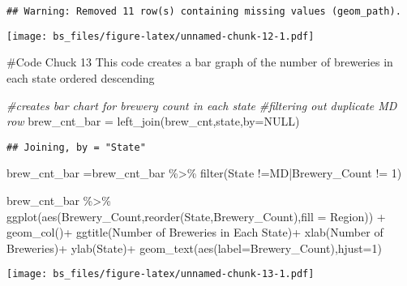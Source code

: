 \documentclass[
]{article}
\newenvironment{Shaded}{\begin{snugshade}}{\end{snugshade}}
\newcommand{\AttributeTok}[1]{\textcolor[rgb]{0.77,0.63,0.00}{#1}}
\newcommand{\CommentTok}[1]{\textcolor[rgb]{0.56,0.35,0.01}{\textit{#1}}}
\newcommand{\ConstantTok}[1]{\textcolor[rgb]{0.00,0.00,0.00}{#1}}
\newcommand{\DecValTok}[1]{\textcolor[rgb]{0.00,0.00,0.81}{#1}}
\newcommand{\FunctionTok}[1]{\textcolor[rgb]{0.00,0.00,0.00}{#1}}
\newcommand{\NormalTok}[1]{#1}
\newcommand{\OtherTok}[1]{\textcolor[rgb]{0.56,0.35,0.01}{#1}}
\newcommand{\SpecialCharTok}[1]{\textcolor[rgb]{0.00,0.00,0.00}{#1}}
\newcommand{\StringTok}[1]{\textcolor[rgb]{0.31,0.60,0.02}{#1}}
\begin{document}
\begin{verbatim}
## Warning: Removed 11 row(s) containing missing values (geom_path).
\end{verbatim}

\texttt{[image: bs\_files/figure-latex/unnamed-chunk-12-1.pdf]}

\#Code Chuck 13 This code creates a bar graph of the number of breweries
in each state ordered descending

\begin{Shaded}
\begin{Highlighting}[]
\CommentTok{\#creates bar chart for brewery count in each state}
\CommentTok{\#filtering out duplicate MD row}
\NormalTok{brew\_cnt\_bar }\OtherTok{=} \FunctionTok{left\_join}\NormalTok{(brew\_cnt,state,}\AttributeTok{by=}\ConstantTok{NULL}\NormalTok{)}
\end{Highlighting}
\end{Shaded}

\begin{verbatim}
## Joining, by = "State"
\end{verbatim}

\begin{Shaded}
\begin{Highlighting}[]
\NormalTok{brew\_cnt\_bar }\OtherTok{=}\NormalTok{brew\_cnt\_bar }\SpecialCharTok{\%\textgreater{}\%} \FunctionTok{filter}\NormalTok{(State }\SpecialCharTok{!=}\StringTok{\textquotesingle{}MD\textquotesingle{}}\SpecialCharTok{|}\NormalTok{Brewery\_Count }\SpecialCharTok{!=} \DecValTok{1}\NormalTok{)}


\NormalTok{brew\_cnt\_bar }\SpecialCharTok{\%\textgreater{}\%}
   \FunctionTok{ggplot}\NormalTok{(}\FunctionTok{aes}\NormalTok{(Brewery\_Count,}\FunctionTok{reorder}\NormalTok{(State,Brewery\_Count),}\AttributeTok{fill =}\NormalTok{ Region)) }\SpecialCharTok{+}
   \FunctionTok{geom\_col}\NormalTok{()}\SpecialCharTok{+}
   \FunctionTok{ggtitle}\NormalTok{(}\StringTok{\textquotesingle{}Number of Breweries in Each State\textquotesingle{}}\NormalTok{)}\SpecialCharTok{+}
   \FunctionTok{xlab}\NormalTok{(}\StringTok{\textquotesingle{}Number of Breweries\textquotesingle{}}\NormalTok{)}\SpecialCharTok{+}
   \FunctionTok{ylab}\NormalTok{(}\StringTok{\textquotesingle{}State\textquotesingle{}}\NormalTok{)}\SpecialCharTok{+}
   \FunctionTok{geom\_text}\NormalTok{(}\FunctionTok{aes}\NormalTok{(}\AttributeTok{label=}\NormalTok{Brewery\_Count),}\AttributeTok{hjust=}\DecValTok{1}\NormalTok{)}
\end{Highlighting}
\end{Shaded}

\texttt{[image: bs\_files/figure-latex/unnamed-chunk-13-1.pdf]}
\end{document}
